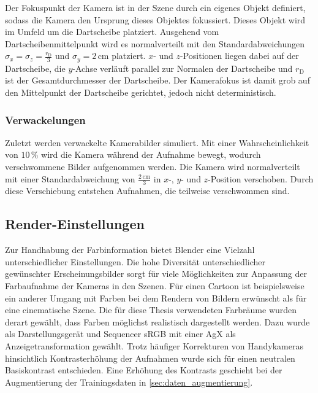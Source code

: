 Der Fokuspunkt der Kamera ist in der Szene durch ein eigenes Objekt definiert, sodass die Kamera den Ursprung dieses Objektes fokussiert. Dieses Objekt wird im Umfeld um die Dartscheibe platziert. Ausgehend vom Dartscheibenmittelpunkt wird es normalverteilt mit den Standardabweichungen $\sigma_x = \sigma_z = \frac{r_\text{D}}{3}$ und $\sigma_y = 2\,\text{cm}$ platziert. $x$- und $z$-Positionen liegen dabei auf der Dartscheibe, die $y$-Achse verläuft parallel zur Normalen der Dartscheibe und $r_\text{D}$ ist der Gesamtdurchmesser der Dartscheibe. Der Kamerafokus ist damit grob auf den Mittelpunkt der Dartscheibe gerichtet, jedoch nicht deterministisch.

\subsubsection{Verwackelungen}
\label{sec:motion_blur}

Zuletzt werden verwackelte Kamerabilder simuliert. Mit einer Wahrscheinlichkeit von $10\,\%$ wird die Kamera während der Aufnahme bewegt, wodurch verschwommene Bilder aufgenommen werden. Die Kamera wird normalverteilt mit einer Standardabweichung von $\frac{2\,\text{cm}}{3}$ in $x$-, $y$- und $z$-Position verschoben. Durch diese Verschiebung entstehen Aufnahmen, die teilweise verschwommen sind.

\subsection{Render-Einstellungen}  %
\label{sec:render_einstellungen}

Zur Handhabung der Farbinformation bietet Blender eine Vielzahl unterschiedlicher Einstellungen. Die hohe Diversität unterschiedlicher gewünschter Erscheinungsbilder sorgt für viele Möglichkeiten zur Anpassung der Farbaufnahme der Kameras in den Szenen. Für einen Cartoon ist beispielsweise ein anderer Umgang mit Farben bei dem Rendern von Bildern erwünscht als für eine cinematische Szene. Die für diese Thesis verwendeten Farbräume wurden derart gewählt, dass Farben möglichst realistisch dargestellt werden. Dazu wurde als Darstellungsgerät und Sequencer sRGB mit einer AgX als Anzeigetransformation gewählt. Trotz häufiger Korrekturen von Handykameras hinsichtlich Kontrasterhöhung der Aufnahmen wurde sich für einen neutralen Basiskontrast entschieden. Eine Erhöhung des Kontrasts geschieht bei der Augmentierung der Trainingsdaten in \autoref{sec:daten_augmentierung}.


